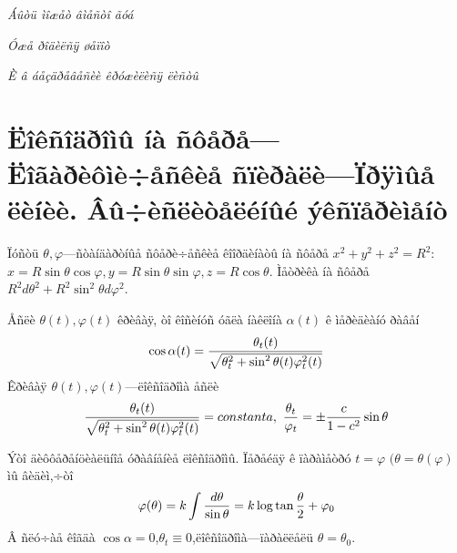 \documentclass[12pt,a4paper]{amsart}
\def\a{\alpha}
\begin{document}
\medskip

         \centerline{\it Áûòü ìîæåò âìåñòî ãóá}
         \centerline{\it   Óæå ðîäèëñÿ øåïîò}
         \centerline{\it È â áåçäðåâåñèè êðóæèëèñÿ ëèñòû}

  \section {Ëîêñîäðîìû íà ñôåðå---Ëîãàðèôìè÷åñêèå  ñïèðàëè---Ïðÿìûå ëèíèè. Âû÷èñëèòåëéíûé ýêñïåðèìåíò}



  Ïóñòü $\theta, \varphi$---ñòàíäàðòíûå ñôåðè÷åñêèå êîîðäèíàòû íà ñôåðå $x^2+y^2+z^2=R^2$:
   $x=R\sin\theta\cos\varphi, y=R\sin\theta\sin\varphi, z=R\cos\theta$. Ìåòðèêà íà ñôåðå
   $R^2d\theta^2+R^2\sin^2\theta d\varphi^2$.



  Åñëè $\theta(t),\varphi(t)$ êðèâàÿ, òî êîñèíóñ óãëà íàêëîíà $\a(t)$ ê ìåðèäèàíó ðàâåí
                                       \begin{equation}\label{cosinusugla}
                                        \cos \a(t)=
                                        {\theta_t(t)\over \sqrt {\theta_t^2+\sin^2 \theta(t)\varphi_t^2(t)} }
                                       \end{equation}
 Êðèâàÿ  $\theta(t),\varphi(t)$---ëîêñîäðîìà åñëè
             \begin{equation}\label{cosinusugla1}
          {\theta_t(t)\over \sqrt {\theta_t^2+\sin^2 \theta(t)\varphi_t^2(t)}}
          =constanta, \,\, {\theta_t\over \varphi_t}=\pm {c\over 1-c^2}\sin \theta
                                       \end{equation}

  Ýòî äèôôåðåíöèàëüíîå óðàâíåíèå ëîêñîäðîìû.
   Ïåðåéäÿ ê ïàðàìåòðó $t=\varphi$ $(\theta=\theta(\varphi)$ ìû âèäèì,÷òî
\begin{equation}\label{eqofloxodroma}
    \varphi(\theta)=k\int {d\theta\over \sin \theta}=k\log\tan {\theta\over 2}+\varphi_0
\end{equation}
Â ñëó÷àå êîãäà $\cos \a=0$,$\theta_t\equiv 0$,ëîêñîäðîìà---ïàðàëëåëü $\theta=\theta_0$.
\end{document}
